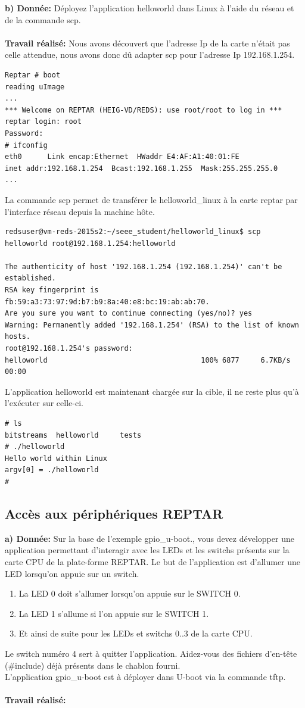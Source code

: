 \textbf{b) Donnée: }Déployez l'application helloworld dans Linux à l'aide du réseau et de la commande scp.\\\\
\textbf{Travail réalisé: } Nous avons découvert que l'adresse Ip de la carte n'était pas celle attendue, nous avons donc dû adapter scp pour l'adresse Ip 192.168.1.254.
\begin{lstlisting}
Reptar # boot
reading uImage
...
*** Welcome on REPTAR (HEIG-VD/REDS): use root/root to log in ***
reptar login: root
Password: 
# ifconfig
eth0      Link encap:Ethernet  HWaddr E4:AF:A1:40:01:FE  
inet addr:192.168.1.254  Bcast:192.168.1.255  Mask:255.255.255.0
...
\end{lstlisting}
La commande scp permet de transférer le helloworld\_linux à la carte reptar par l'interface réseau depuis la machine hôte.
\begin{lstlisting}
redsuser@vm-reds-2015s2:~/seee_student/helloworld_linux$ scp helloworld root@192.168.1.254:helloworld

The authenticity of host '192.168.1.254 (192.168.1.254)' can't be established.
RSA key fingerprint is fb:59:a3:73:97:9d:b7:b9:8a:40:e8:bc:19:ab:ab:70.
Are you sure you want to continue connecting (yes/no)? yes
Warning: Permanently added '192.168.1.254' (RSA) to the list of known hosts.
root@192.168.1.254's password: 
helloworld                                    100% 6877     6.7KB/s   00:00    
\end{lstlisting}
L'application helloworld est maintenant chargée sur la cible, il ne reste plus qu'à l'exécuter sur celle-ci.
\begin{lstlisting}
# ls
bitstreams  helloworld     tests
# ./helloworld 
Hello world within Linux
argv[0] = ./helloworld
#
\end{lstlisting}
\subsection{Accès aux périphériques REPTAR}
\textbf{a) Donnée: } Sur la base de l’exemple gpio\_u-boot., vous devez développer une application permettant d’interagir avec les
LEDs et les switchs présents sur la carte CPU de la plate-forme REPTAR.
Le but de l’application est d’allumer une LED lorsqu’on appuie sur un switch.
\begin{enumerate}
	\item La LED 0 doit s’allumer lorsqu’on appuie sur le SWITCH 0.
	\item La LED 1 s’allume si l’on appuie sur le SWITCH 1.
	\item Et ainsi de suite pour les LEDs et switchs 0..3 de la carte CPU.
\end{enumerate}
Le switch numéro 4 sert à quitter l’application. Aidez-vous des fichiers d'en-tête (\#include) déjà présents dans
le chablon fourni.\\
L’application gpio\_u-boot est à déployer dans U-boot via la commande tftp. \\\\
\textbf{Travail réalisé: }\\\\
